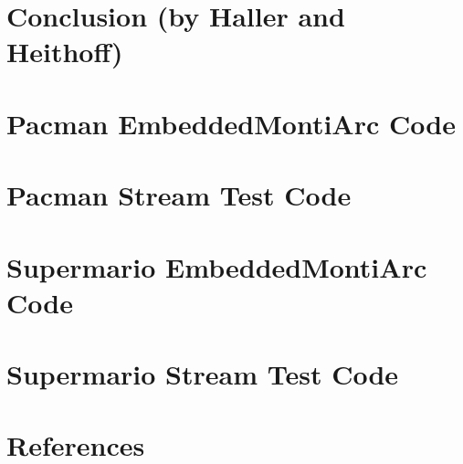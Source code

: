 \documentclass{elsarticle}
\begin{document}
\section{Conclusion (by Haller and Heithoff)}
\label{sec:conclusion}

\begin{appendix}
\section{Pacman EmbeddedMontiArc Code}

\section{Pacman Stream Test Code}


\clearpage
\section{Supermario EmbeddedMontiArc Code}


\clearpage
\section{Supermario Stream Test Code}

\end{appendix}

\clearpage
\section*{References}

\end{document}
